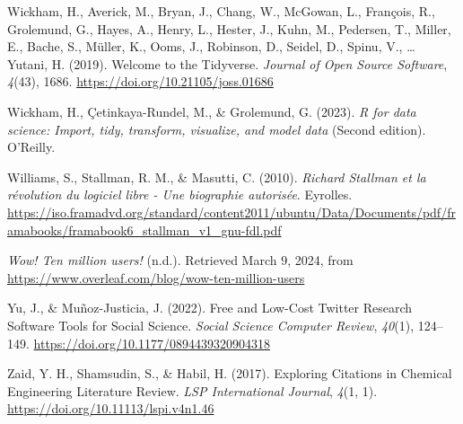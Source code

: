 \documentclass[
  letterpaper,
  DIV=11,
  numbers=noendperiod]{scrreprt}
\newlength{\cslhangindent}
\newlength{\cslentryspacingunit} %
\newenvironment{CSLReferences}[2] %
 {%
  \setlength{\parindent}{0pt}
  \ifodd #1
  \let\oldpar\par
  \def\par{\hangindent=\cslhangindent\oldpar}
  \fi
  \setlength{\parskip}{#2\cslentryspacingunit}
 }%
 {}
\begin{document}
\begin{CSLReferences}{1}{0}
\leavevmode{}%
Wickham, H., Averick, M., Bryan, J., Chang, W., McGowan, L., François,
R., Grolemund, G., Hayes, A., Henry, L., Hester, J., Kuhn, M., Pedersen,
T., Miller, E., Bache, S., Müller, K., Ooms, J., Robinson, D., Seidel,
D., Spinu, V., \ldots{} Yutani, H. (2019). Welcome to the {Tidyverse}.
\emph{Journal of Open Source Software}, \emph{4}(43), 1686.
\url{https://doi.org/10.21105/joss.01686}

\leavevmode{}%
Wickham, H., Çetinkaya-Rundel, M., \& Grolemund, G. (2023). \emph{R for
data science: Import, tidy, transform, visualize, and model data}
(Second edition). O'Reilly.

\leavevmode{}%
Williams, S., Stallman, R. M., \& Masutti, C. (2010). \emph{Richard
Stallman et la révolution du logiciel libre - Une biographie autorisée}.
Eyrolles.
\url{https://iso.framadvd.org/standard/content2011/ubuntu/Data/Documents/pdf/framabooks/framabook6_stallman_v1_gnu-fdl.pdf}

\leavevmode{}%
\emph{Wow! {Ten} million users!} (n.d.). Retrieved March 9, 2024, from
\url{https://www.overleaf.com/blog/wow-ten-million-users}

\leavevmode{}%
Yu, J., \& Muñoz-Justicia, J. (2022). Free and {Low-Cost Twitter
Research Software Tools} for {Social Science}. \emph{Social Science
Computer Review}, \emph{40}(1), 124--149.
\url{https://doi.org/10.1177/0894439320904318}

\leavevmode{}%
Zaid, Y. H., Shamsudin, S., \& Habil, H. (2017). Exploring {Citations}
in {Chemical Engineering Literature Review}. \emph{LSP International
Journal}, \emph{4}(1, 1). \url{https://doi.org/10.11113/lspi.v4n1.46}

\end{CSLReferences}
\end{document}

